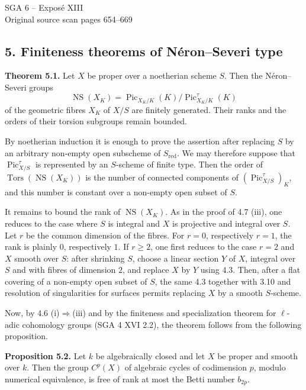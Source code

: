 \documentclass[11pt]{article}
\providecommand{\Pic}{\operatorname{Pic}}
\begin{document}
\providecommand{\NS}{\operatorname{NS}}
\providecommand{\Picard}{\operatorname{Pic}}
\providecommand{\Et}{\mathrm{et}}
\providecommand{\rk}{\operatorname{rk}}
\providecommand{\im}{\operatorname{Im}}
\providecommand{\HH}{\mathrm H}

\begin{center}
{\Large SGA 6 -- Exposé XIII}\\[0.4em]
{\large Original source scan pages 654--669}
\end{center}


\subsection*{5. Finiteness theorems of N\'eron--Severi type}

\textbf{Theorem 5.1.} Let $X$ be proper over a noetherian scheme $S$. Then the N\'eron--Severi groups
\[
   \NS(X_K)=\Pic_{X_K/K}(K)/\Pic^\tau_{X_K/K}(K)
\]
of the geometric fibres $X_K$ of $X/S$ are finitely generated. Their ranks and the orders of their torsion subgroups remain bounded.

By noetherian induction it is enough to prove the assertion after replacing $S$ by an arbitrary non-empty open subscheme of $S_{\mathrm{red}}$. We may therefore suppose that $\Pic^\tau_{X/S}$ is represented by an $S$-scheme of finite type. Then the order of $\operatorname{Tors}(\NS(X_K))$ is the number of connected components of $(\Pic^\tau_{X/S})_K$, and this number is constant over a non-empty open subset of $S$.

It remains to bound the rank of $\NS(X_K)$. As in the proof of 4.7 (iii), one reduces to the case where $S$ is integral and $X$ is projective and integral over $S$. Let $r$ be the common dimension of the fibres. For $r=0$, respectively $r=1$, the rank is plainly $0$, respectively $1$. If $r\ge2$, one first reduces to the case $r=2$ and $X$ smooth over $S$: after shrinking $S$, choose a linear section $Y$ of $X$, integral over $S$ and with fibres of dimension $2$, and replace $X$ by $Y$ using 4.3. Then, after a flat covering of a non-empty open subset of $S$, the same 4.3 together with 3.10 and resolution of singularities for surfaces permits replacing $X$ by a smooth $S$-scheme.

Now, by 4.6 (i)$\Rightarrow$(iii) and by the finiteness and specialization theorem for $\ell$-adic cohomology groups (SGA 4 XVI 2.2), the theorem follows from the following proposition.

\textbf{Proposition 5.2.} Let $k$ be algebraically closed and let $X$ be proper and smooth over $k$. Then the group $C^p(X)$ of algebraic cycles of codimension $p$, modulo numerical equivalence, is free of rank at most the Betti number $b_{2p}$.
\end{document}
